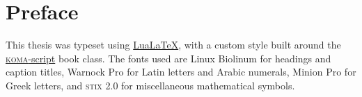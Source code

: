 \chapter*{Preface}\noindent
\lipsum

This thesis was typeset using \href{http://www.luatex.org/}{LuaLaTeX}, with a custom style built around the \href{https://ctan.org/pkg/koma-script?lang=en}{\textsc{koma}-script} book class.
The fonts used are Linux Biolinum for headings and caption titles, Warnock Pro for Latin letters and Arabic numerals, Minion Pro for Greek letters, and \textsc{stix} 2.0 for miscellaneous mathematical symbols.
